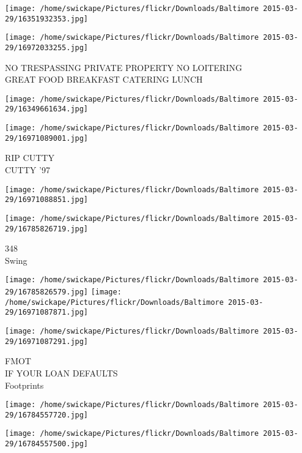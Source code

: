 \documentclass[10pt,letterpaper]{article}
\begin{document}
\texttt{[image: /home/swickape/Pictures/flickr/Downloads/Baltimore 2015-03-29/16351932353.jpg]}

\vspace{0.25in}
\texttt{[image: /home/swickape/Pictures/flickr/Downloads/Baltimore 2015-03-29/16972033255.jpg]}

NO TRESPASSING PRIVATE PROPERTY NO LOITERING\\
GREAT FOOD BREAKFAST CATERING LUNCH\\
\pagebreak

\texttt{[image: /home/swickape/Pictures/flickr/Downloads/Baltimore 2015-03-29/16349661634.jpg]}

\vspace{0.25in}
\texttt{[image: /home/swickape/Pictures/flickr/Downloads/Baltimore 2015-03-29/16971089001.jpg]}

RIP CUTTY\\
CUTTY '97\\
\pagebreak

\texttt{[image: /home/swickape/Pictures/flickr/Downloads/Baltimore 2015-03-29/16971088851.jpg]}

\vspace{0.25in}
\texttt{[image: /home/swickape/Pictures/flickr/Downloads/Baltimore 2015-03-29/16785826719.jpg]}

348\\
Swing\\
\pagebreak

\texttt{[image: /home/swickape/Pictures/flickr/Downloads/Baltimore 2015-03-29/16785826579.jpg]}
\texttt{[image: /home/swickape/Pictures/flickr/Downloads/Baltimore 2015-03-29/16971087871.jpg]}

\texttt{[image: /home/swickape/Pictures/flickr/Downloads/Baltimore 2015-03-29/16971087291.jpg]}

FMOT\\
IF YOUR LOAN DEFAULTS\\
Footprints\\
\pagebreak

\texttt{[image: /home/swickape/Pictures/flickr/Downloads/Baltimore 2015-03-29/16784557720.jpg]}

\vspace{0.25in}
\texttt{[image: /home/swickape/Pictures/flickr/Downloads/Baltimore 2015-03-29/16784557500.jpg]}
\end{document}
